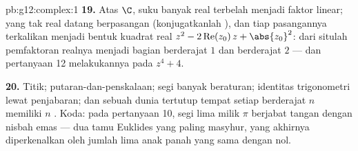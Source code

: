\begin{solution}{pb:g12:complex:1}
\textbf{19.} Atas $\C$, suku banyak real terbelah menjadi faktor
linear;  yang tak real datang berpasangan  (konjugatkanlah
), dan tiap pasangannya terkalikan menjadi bentuk kuadrat real
$z^2 - 2\operatorname{Re}(z_0)\,z + \abs{z_0}^2$: dari situlah
pemfaktoran realnya menjadi bagian berderajat $1$ dan berderajat $2$ ---
dan pertanyaan 12 melakukannya pada $z^4 + 4$.

\textbf{20.} Titik; putaran-dan-penskalaan; segi banyak beraturan;
identitas trigonometri lewat penjabaran; dan sebuah dunia tertutup
tempat setiap  berderajat $n$ memiliki $n$ . Koda:
pada pertanyaan 10, segi lima milik $\pi$ berjabat tangan dengan nisbah
emas --- dua tamu Euklides yang paling masyhur, yang akhirnya diperkenalkan
oleh jumlah lima anak panah yang sama dengan nol.

\end{solution}
